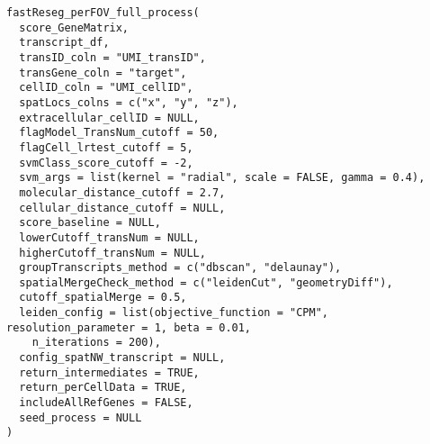 \documentclass[letterpaper]{book}
\begin{document}
\begin{Usage}
\begin{verbatim}
fastReseg_perFOV_full_process(
  score_GeneMatrix,
  transcript_df,
  transID_coln = "UMI_transID",
  transGene_coln = "target",
  cellID_coln = "UMI_cellID",
  spatLocs_colns = c("x", "y", "z"),
  extracellular_cellID = NULL,
  flagModel_TransNum_cutoff = 50,
  flagCell_lrtest_cutoff = 5,
  svmClass_score_cutoff = -2,
  svm_args = list(kernel = "radial", scale = FALSE, gamma = 0.4),
  molecular_distance_cutoff = 2.7,
  cellular_distance_cutoff = NULL,
  score_baseline = NULL,
  lowerCutoff_transNum = NULL,
  higherCutoff_transNum = NULL,
  groupTranscripts_method = c("dbscan", "delaunay"),
  spatialMergeCheck_method = c("leidenCut", "geometryDiff"),
  cutoff_spatialMerge = 0.5,
  leiden_config = list(objective_function = "CPM", resolution_parameter = 1, beta = 0.01,
    n_iterations = 200),
  config_spatNW_transcript = NULL,
  return_intermediates = TRUE,
  return_perCellData = TRUE,
  includeAllRefGenes = FALSE,
  seed_process = NULL
)
\end{verbatim}
\end{Usage}
%
\end{document}
